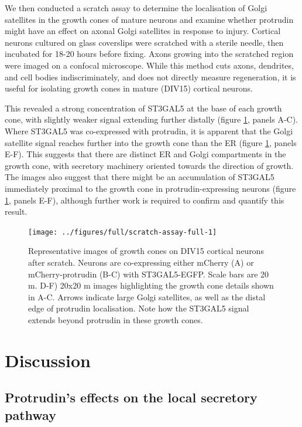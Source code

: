 \documentclass[
  12pt,
  a4paper,
]{book}
\begin{document}
We then conducted a scratch assay to determine the localisation of Golgi satellites in the growth cones of mature neurons and examine whether protrudin might have an effect on axonal Golgi satellites in response to injury. Cortical neurons cultured on glass coverslips were scratched with a sterile needle, then incubated for 18-20 hours before fixing. Axons growing into the scratched region were imaged on a confocal microscope. While this method cuts axons, dendrites, and cell bodies indiscriminately, and does not directly measure regeneration, it is useful for isolating growth cones in mature (DIV15) cortical neurons.

This revealed a strong concentration of ST3GAL5 at the base of each growth cone, with slightly weaker signal extending further distally (figure \ref{fig:scratch-assay-full}, panels A-C). Where ST3GAL5 was co-expressed with protrudin, it is apparent that the Golgi satellite signal reaches further into the growth cone than the ER (figure \ref{fig:scratch-assay-full}, panels E-F). This suggests that there are distinct ER and Golgi compartments in the growth cone, with secretory machinery oriented towards the direction of growth. The images also suggest that there might be an accumulation of ST3GAL5 immediately proximal to the growth cone in protrudin-expressing neurons (figure \ref{fig:scratch-assay-full}, panels E-F), although further work is required to confirm and quantify this result.

\begin{figure}
\texttt{[image: ../figures/full/scratch-assay-full-1]} \caption[Scratch assay of neurons co-expressing protrudin and ST3GAL5]{Representative images of growth cones on DIV15 cortical neurons after scratch.  Neurons are co-expressing either mCherry (A) or mCherry-protrudin (B-C) with ST3GAL5-EGFP.  Scale bars are 20 \textmu{}m.  D-F) 20x20 \textmu{}m images highlighting the growth cone details shown in A-C.  Arrows indicate large Golgi satellites, as well as the distal edge of protrudin localisation.  Note how the ST3GAL5 signal extends beyond protrudin in these growth cones.}\label{fig:scratch-assay-full}
\end{figure}

\section{Discussion}\label{discussion-1}

\subsection{Protrudin's effects on the local secretory pathway}\label{protrudins-effects-on-the-local-secretory-pathway}
\end{document}
